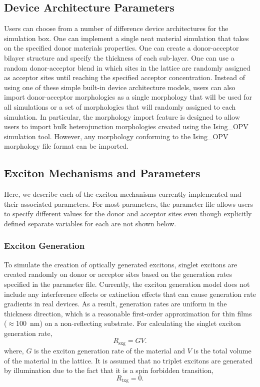 \documentclass[%
 reprint,onecolumn,notitlepage,
superscriptaddress,longbibliography,
 amsmath,amssymb,
 aps,rmp,floatfix,
]{revtex4-1}
\begin{document}
\subsection{Device Architecture Parameters}

Users can choose from a number of difference device architectures for the simulation box.
One can implement a single neat material simulation that takes on the specified donor materials properties.
One can create a donor-acceptor bilayer structure and specify the thickness of each sub-layer.
One can use a random donor-acceptor blend in which sites in the lattice are randomly assigned as acceptor sites until reaching the specified acceptor concentration.
Instead of using one of these simple built-in device architecture models, users can also import donor-acceptor morphologies as a single morphology that will be used for all simulations or a set of morphologies that will randomly assigned to each simulation. 
In particular, the morphology import feature is designed to allow users to import bulk heterojunction morphologies created using the Ising\_OPV simulation tool.\cite{heiber2018joss}
However, any morphology conforming to the Ising\_OPV morphology file format can be imported.

\subsection{Exciton Mechanisms and Parameters}

Here, we describe each of the exciton mechanisms currently implemented and their associated parameters.
For most parameters, the parameter file allows users to specify different values for the donor and acceptor sites even though explicitly defined separate variables for each are not shown below.

\subsubsection{Exciton Generation}

To simulate the creation of optically generated excitons, singlet excitons are created randomly on donor or acceptor sites based on the generation rates specified in the parameter file. 
Currently, the exciton generation model does not include any interference effects or extinction effects that can cause generation rate gradients in real devices. As a result, generation rates are uniform in the thickness direction, which is a reasonable first-order approximation for thin films ($\approx$100~nm) on a non-reflecting substrate. 
For calculating the singlet exciton generation rate,
$$R_\text{sxg} = G V.$$
where, $G$ is the exciton generation rate of the material and $V$ is the total volume of the material in the lattice.
It is assumed that no triplet excitons are generated by illumination due to the fact that it is a spin forbidden transition,
$$R_\text{txg} = 0.$$
\end{document}
